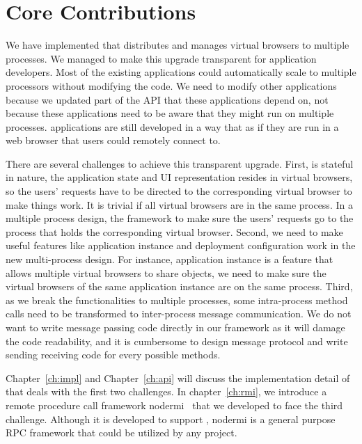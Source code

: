 \section{Core Contributions}

We have implemented \cbtwo that distributes and manages virtual browsers
to multiple processes.
We managed to make this upgrade transparent for application developers.
Most of the existing applications could automatically scale to 
multiple processors without modifying the code.
We need to modify other applications because we updated part of
the \cb{} API that these applications depend on,
not because these applications need to be aware that they might run on
multiple processes.
\cb{} applications are still developed in a way that as if they are run in
a web browser that users could remotely connect to.

There are several challenges to achieve this transparent upgrade.
First, \cb{} is stateful in nature, 
the application state and UI representation resides in virtual browsers,
so the users' requests have to be directed to the corresponding virtual browser
to make things work.
It is trivial if all virtual browsers are in the same process.
In a multiple process design,
the framework to make sure the users' requests go to the process that holds the
corresponding virtual browser.
Second, we need to make useful features like application instance and
deployment configuration work in the new multi-process design.
For instance, application instance is a feature that allows multiple virtual browsers
to share objects, we need to make sure the virtual browsers of the same application 
instance are on the same process.
Third, as we break the functionalities to multiple processes,
some intra-process method calls need to be transformed to inter-process message
communication.
We do not want to write message passing code directly in our framework as it
will damage the code readability, and it is cumbersome to design message protocol
and write sending receiving code for every possible methods.

Chapter~\ref{ch:impl} and Chapter~\ref{ch:api} will discuss the implementation detail
of \cbtwo that deals with the first two challenges.
In chapter~\ref{ch:rmi}, 
we introduce a remote procedure call framework nodermi~\cite{nodermi} that we developed
to face the third challenge.
Although it is developed to support \cbtwo,
nodermi is a general purpose RPC framework that could be utilized by
any \nodejs project.
